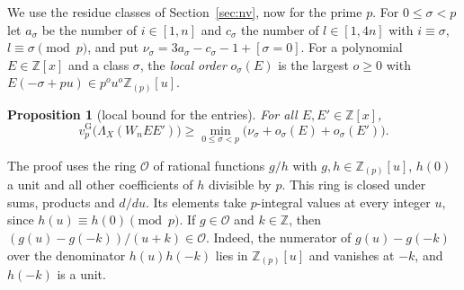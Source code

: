 \documentclass[11pt]{amsart}
\newtheorem{proposition}[theorem]{Proposition}
\theoremstyle{definition}
\theoremstyle{remark}
\numberwithin{equation}{section}
\newcommand{\Z}{\mathbb Z}
\newcommand{\vG}{v_p^{\mathrm G}}
\begin{document}
We use the residue classes of Section~\ref{sec:nv}, now for the prime $p$. For $0\le\sigma<p$ let $a_\sigma$ be the
number of $i\in[1,n]$ and $c_\sigma$ the number of $l\in[1,4n]$ with $i\equiv\sigma$, $l\equiv\sigma\pmod p$, and put
$\nu_\sigma=3a_\sigma-c_\sigma-1+[\sigma=0]$. For a polynomial $E\in\Z[x]$ and a class $\sigma$, the \emph{local order}
$o_\sigma(E)$ is the largest $o\ge0$ with $E(-\sigma+pu)\in p^ou^o\Z_{(p)}[u]$.

\begin{proposition}[local bound for the entries]\label{tp:prop:entry}
For all $E,E'\in\Z[x]$,
\[
 \vG\bigl(\Lambda_X(W_nEE')\bigr)\ge\min_{0\le\sigma<p}\bigl(\nu_\sigma+o_\sigma(E)+o_\sigma(E')\bigr).
\]
\end{proposition}

The proof uses the ring $\mathcal O$ of rational functions $g/h$ with $g,h\in\Z_{(p)}[u]$, $h(0)$ a unit and all other
coefficients of $h$ divisible by $p$. This ring is closed under sums, products and $d/du$. Its elements take
$p$-integral values at every integer $u$, since $h(u)\equiv h(0)\pmod p$. If $g\in\mathcal O$ and $k\in\Z$, then
$(g(u)-g(-k))/(u+k)\in\mathcal O$. Indeed, the numerator of $g(u)-g(-k)$ over the denominator $h(u)h(-k)$ lies in
$\Z_{(p)}[u]$ and vanishes at $-k$, and $h(-k)$ is a unit.
\end{document}
